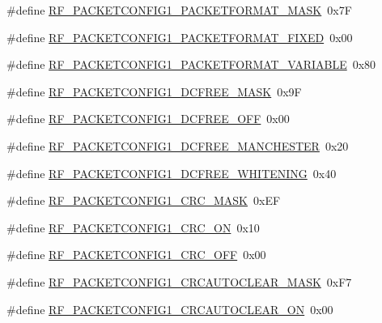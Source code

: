 \begin{DoxyCompactItemize}
\#define \hyperlink{sx1276Regs-Fsk_8h_a49a5b9d17a41eac837198daf073a8bc2}{R\+F\+\_\+\+P\+A\+C\+K\+E\+T\+C\+O\+N\+F\+I\+G1\+\_\+\+P\+A\+C\+K\+E\+T\+F\+O\+R\+M\+A\+T\+\_\+\+M\+A\+SK}~0x7F
\item 
\#define \hyperlink{sx1276Regs-Fsk_8h_a9bcb87a30f7c182b7434cb87fdcb8187}{R\+F\+\_\+\+P\+A\+C\+K\+E\+T\+C\+O\+N\+F\+I\+G1\+\_\+\+P\+A\+C\+K\+E\+T\+F\+O\+R\+M\+A\+T\+\_\+\+F\+I\+X\+ED}~0x00
\item 
\#define \hyperlink{sx1276Regs-Fsk_8h_a3ea46ce872f527e487bfc9ad5bc04fda}{R\+F\+\_\+\+P\+A\+C\+K\+E\+T\+C\+O\+N\+F\+I\+G1\+\_\+\+P\+A\+C\+K\+E\+T\+F\+O\+R\+M\+A\+T\+\_\+\+V\+A\+R\+I\+A\+B\+LE}~0x80
\item 
\#define \hyperlink{sx1276Regs-Fsk_8h_a16146b7b76f771448f92a63952fed8ba}{R\+F\+\_\+\+P\+A\+C\+K\+E\+T\+C\+O\+N\+F\+I\+G1\+\_\+\+D\+C\+F\+R\+E\+E\+\_\+\+M\+A\+SK}~0x9F
\item 
\#define \hyperlink{sx1276Regs-Fsk_8h_a3ff7ed664dafac3f35c529684e793afd}{R\+F\+\_\+\+P\+A\+C\+K\+E\+T\+C\+O\+N\+F\+I\+G1\+\_\+\+D\+C\+F\+R\+E\+E\+\_\+\+O\+FF}~0x00
\item 
\#define \hyperlink{sx1276Regs-Fsk_8h_aa8d6a62ddb02dee4e3d477c9c6a7e621}{R\+F\+\_\+\+P\+A\+C\+K\+E\+T\+C\+O\+N\+F\+I\+G1\+\_\+\+D\+C\+F\+R\+E\+E\+\_\+\+M\+A\+N\+C\+H\+E\+S\+T\+ER}~0x20
\item 
\#define \hyperlink{sx1276Regs-Fsk_8h_aca0b24d6db23ec11341111780a769c46}{R\+F\+\_\+\+P\+A\+C\+K\+E\+T\+C\+O\+N\+F\+I\+G1\+\_\+\+D\+C\+F\+R\+E\+E\+\_\+\+W\+H\+I\+T\+E\+N\+I\+NG}~0x40
\item 
\#define \hyperlink{sx1276Regs-Fsk_8h_ad7dcff9e6dc9092816aea02a997fbce2}{R\+F\+\_\+\+P\+A\+C\+K\+E\+T\+C\+O\+N\+F\+I\+G1\+\_\+\+C\+R\+C\+\_\+\+M\+A\+SK}~0x\+EF
\item 
\#define \hyperlink{sx1276Regs-Fsk_8h_ad7837efcf34cc8d322f9a6804d6862cc}{R\+F\+\_\+\+P\+A\+C\+K\+E\+T\+C\+O\+N\+F\+I\+G1\+\_\+\+C\+R\+C\+\_\+\+ON}~0x10
\item 
\#define \hyperlink{sx1276Regs-Fsk_8h_adadf61508b683e35a68324d98bf08ae7}{R\+F\+\_\+\+P\+A\+C\+K\+E\+T\+C\+O\+N\+F\+I\+G1\+\_\+\+C\+R\+C\+\_\+\+O\+FF}~0x00
\item 
\#define \hyperlink{sx1276Regs-Fsk_8h_a71ef80b56ede94b1e6f5216296a549a2}{R\+F\+\_\+\+P\+A\+C\+K\+E\+T\+C\+O\+N\+F\+I\+G1\+\_\+\+C\+R\+C\+A\+U\+T\+O\+C\+L\+E\+A\+R\+\_\+\+M\+A\+SK}~0x\+F7
\item 
\#define \hyperlink{sx1276Regs-Fsk_8h_ab08c36961942390a8d7bf306c3811bca}{R\+F\+\_\+\+P\+A\+C\+K\+E\+T\+C\+O\+N\+F\+I\+G1\+\_\+\+C\+R\+C\+A\+U\+T\+O\+C\+L\+E\+A\+R\+\_\+\+ON}~0x00

\end{DoxyCompactItemize}
